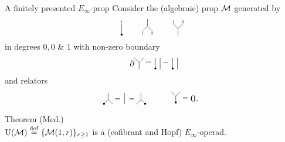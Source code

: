 \begin{frame}{A finitely presented $E_\infty$-prop}
	\pause Consider the (algebraic) prop $\mathcal{M}$ generated by
	\[
	\begin{tikzpicture}[scale=.4]
		\draw (0,.5)--(0,-.75);
		\node[scale=.5] at (0,.75){1};
		\fill (0,-.65) circle (3pt);
	\end{tikzpicture}
	\qquad
	\begin{tikzpicture}[scale=.4]
		\draw (0,0)--(0,.75);
		\draw (0,0)--(.5,-.5);
		\draw (0,0)--(-.5,-.5);
		\node[scale=.5] at (-.5,-.75){1};
		\node[scale=.5] at (.5,-.75){2};
	\end{tikzpicture}
	\qquad
	\begin{tikzpicture}[scale=.4]
		\draw (0,0)--(0,-.75);
		\draw (0,0)--(.5,.5);
		\draw (0,0)--(-.5,.5);
		\node[scale=.5] at (-.5,.75){1};
		\node[scale=.5] at (.5,.75){2};
	\end{tikzpicture}
	\vspace*{-2pt}
	\]
	in degrees $0, 0$ \& $1$ with non-zero boundary
	\[
	\begin{tikzpicture}[scale=.4]
		\node[scale=1] at (-.75,-.1){$\partial$};
		\draw (0,0)--(0,-.75);
		\draw (0,0)--(.5,.5);
		\draw (0,0)--(-.5,.5);
		\node[scale=1] at (1,0){$=$};
	\end{tikzpicture}
	\begin{tikzpicture}[scale=.4]
		\draw (0,.5)--(0,-.75);
		\fill (0,-.65) circle (3pt);
		\draw (.5,.5)--(.5,-.75);
		\node[scale=1] at (1.1,0){$-$};
	\end{tikzpicture}
	\begin{tikzpicture}[scale=.4]
		\draw (0,.5)--(0,-.75);
		\fill (0,-.65) circle (3pt);
		\draw (.5,.5)--(.5,-.75);
	\end{tikzpicture}
	\]
	\vskip-5pt
	and relators
	\[
	\begin{tikzpicture}[scale=.4]
		\draw (0,0)--(0,.75);
		\draw (0,0)--(.5,-.5);
		\draw (0,0)--(-.5,-.5);
		\fill (-.45,-.45) circle (3pt);
		\node[scale=.8] at (1,0){$=$};
		\draw (1.75,.75)--(1.75,-.5);
		\node[scale=.8] at (2.5,0){$=$};
		\draw (3.5,0)--(3.5,.75);
		\draw (3.5,0)--(4,-.5);
		\draw (3.5,0)--(3,-.5);
		\fill (3.95,-.45) circle (3pt);
	\end{tikzpicture}
	\quad\qquad
	\begin{tikzpicture}[scale=.4]
		\draw (0,0)--(0,-.75);
		\draw (0,0)--(.5,.5);
		\draw (0,0)--(-.5,.5);
		\fill (0,-.7) circle (3pt);
		\node[scale=.8] at (1,-.25){$=$};
		\node[scale=1.2] at (2,-.25){$0.$};
	\end{tikzpicture}
	\]

	\medskip\pause
	\textcolor{pblue}{Theorem (Med.)} \\
	$\operatorname{U}(\mathcal{M}) \stackrel{\mathrm{def}}{=} \{\mathcal{M}(1,r)\}_{r \geq 1}$ is a (cofibrant and Hopf) $E_\infty$-operad.
\end{frame}

